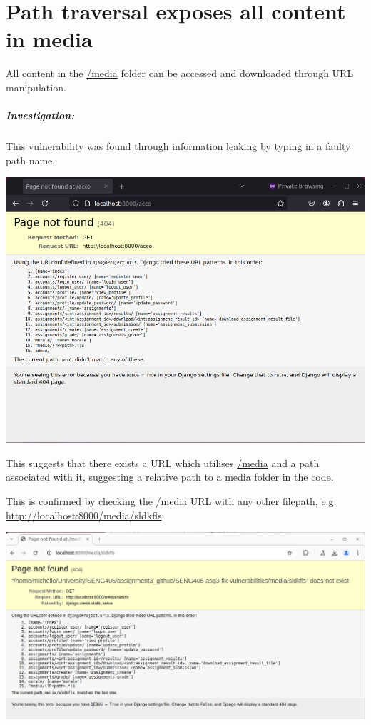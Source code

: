 
\section{Path traversal exposes all content in media}

All content in the \url{/media} folder can be accessed and downloaded through URL manipulation.

\subparagraph{Investigation:}

This vulnerability was found through information leaking by typing in a faulty path name.
\begin{center}
    \includegraphics[width = \linewidth]{images/Michelle/debug.png}
\end{center}
This suggests that there exists a URL which utilises \url{/media} and a path associated with it, suggesting a relative path to a media folder in the code.

This is confirmed by checking the \url{/media} URL with any other filepath, e.g. \url{http://localhost:8000/media/sldkfls}:
\begin{center}
    \includegraphics[width = \linewidth]{images/Michelle/pathleaking1.png}
\end{center}


